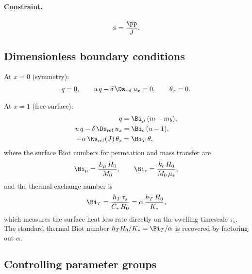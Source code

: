 \paragraph{Constraint.}
\begin{equation}
  \phi = \frac{\pp}{J}.
\end{equation}

\subsection{Dimensionless boundary conditions}

At $x=0$ (symmetry):
\begin{equation}
  q = 0, \qquad
  u\,q - \delta\,\Ds_\mathrm{ref}\,u_x = 0, \qquad
  \theta_x = 0.
  \label{eq:bc0_nondim}
\end{equation}

At $x=1$ (free surface):
\begin{align}
  q &= \Bi_\mu\,(m - m_b), \label{eq:bc1_mu} \\
  u\,q - \delta\,\Ds_\mathrm{ref}\,u_x &= \Bi_c\,(u - 1), \label{eq:bc1_c} \\
  -\alpha\,\Ks_\mathrm{ref}(J)\,\theta_x &= \Bi_T\,\theta, \label{eq:bc1_T}
\end{align}
where the surface Biot numbers for permeation and mass transfer are
\begin{equation}
  \Bi_\mu = \frac{L_\mu\,H_0}{M_0},
  \qquad
  \Bi_c = \frac{k_c\,H_0}{M_0\,\mu_*},
  \label{eq:Bi_mu_c}
\end{equation}
and the thermal exchange number is
\begin{equation}
  \Bi_T = \frac{h_T\,\tau_s}{C_*\,H_0}
  = \alpha\,\frac{h_T\,H_0}{K_*},
  \label{eq:Bi_T}
\end{equation}
which measures the surface heat loss rate directly on the swelling
timescale $\tau_s$.  The standard thermal Biot number
$h_T H_0/K_*=\Bi_T/\alpha$ is recovered by factoring out $\alpha$.

\subsection{Controlling parameter groups}


